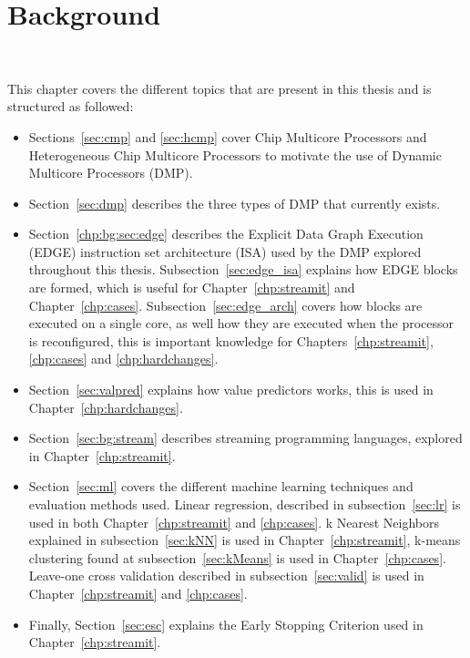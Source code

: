 \chapter{Background}~\label{chp:Background}

This chapter covers the different topics that are present in this thesis and is structured as followed:
\begin{itemize}
\item Sections~\ref{sec:cmp} and \ref{sec:hcmp} cover Chip Multicore Processors and Heterogeneous Chip Multicore Processors to motivate the use of Dynamic Multicore Processors (DMP).
\item Section~\ref{sec:dmp}  describes the three types of DMP that currently exists.
\item Section~\ref{chp:bg:sec:edge} describes the Explicit Data Graph Execution (EDGE) instruction set architecture (ISA) used by the DMP explored throughout this thesis.
Subsection~\ref{sec:edge_isa} explains how EDGE blocks are formed, which is useful for Chapter~\ref{chp:streamit} and Chapter~\ref{chp:cases}.
Subsection~\ref{sec:edge_arch} covers how blocks are executed on a single core, as well how they are executed when the processor is reconfigured, this is important knowledge for Chapters~\ref{chp:streamit}, \ref{chp:cases} and \ref{chp:hardchanges}.
\item Section~\ref{sec:valpred} explains how value predictors works, this is used in Chapter~\ref{chp:hardchanges}.
\item Section~\ref{sec:bg:stream} describes streaming programming languages, explored in Chapter~\ref{chp:streamit}.
\item Section~\ref{sec:ml} covers the different machine learning techniques and evaluation methods used.
Linear regression, described in subsection~\ref{sec:lr} is used in both Chapter~\ref{chp:streamit} and \ref{chp:cases}.
k Nearest Neighbors explained in subsection~\ref{sec:kNN} is used in Chapter~\ref{chp:streamit}, k-means clustering found at subsection~\ref{sec:kMeans} is used in Chapter~\ref{chp:cases}.
Leave-one cross validation described in subsection~\ref{sec:valid} is used in Chapter~\ref{chp:streamit} and \ref{chp:cases}.
\item Finally, Section~\ref{sec:esc} explains the Early Stopping Criterion used in Chapter~\ref{chp:streamit}.
\end{itemize}
